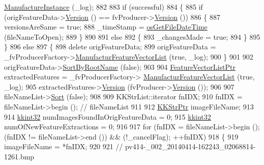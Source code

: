 \begin{DoxyCode}
      \hyperlink{class_k_k_m_l_l_1_1_factory_f_v_producer_ab69f27aed9bda4917326580ec824e749}{ManufactureInstance} (\_log);
882 
883   \textcolor{keywordflow}{if}  (successful)
884   \{
885     \textcolor{keywordflow}{if}  (origFeatureData->\hyperlink{class_k_k_m_l_l_1_1_feature_vector_list_a01b3c7a97f5b58639c8aee826fa15dc9}{Version} () == fvProducer->\hyperlink{class_k_k_m_l_l_1_1_feature_vector_producer_a8e2f54e185b2fb5de854d9978b4fbac8}{Version} ())
886     \{
887       versionsAreSame = \textcolor{keyword}{true};
888       \_timeStamp = \hyperlink{namespace_k_k_b_a0c28dcf4ba36d924a50454c84aee3931}{osGetFileDateTime} (fileNameToOpen);
889     \}
890 
891     \textcolor{keywordflow}{else}
892     \{
893       \_changesMade = \textcolor{keyword}{true};
894     \}
895   \}
896   \textcolor{keywordflow}{else}
897   \{
898     \textcolor{keyword}{delete}  origFeatureData;
899     origFeatureData = \_fvProducerFactory->\hyperlink{class_k_k_m_l_l_1_1_factory_f_v_producer_a96126b7adb55f6751450ede393c93086}{ManufacturFeatureVectorList} (\textcolor{keyword}{true}, 
      \_log);
900   \}
901 
902   origFeatureData->\hyperlink{class_k_k_m_l_l_1_1_feature_vector_list_a87e679a6419e6d7a1dc28a28d4cb96cb}{SortByRootName} (\textcolor{keyword}{false});
903 
904   \hyperlink{class_k_k_m_l_l_1_1_feature_vector_list}{FeatureVectorListPtr}  extractedFeatures = \_fvProducerFactory->
      \hyperlink{class_k_k_m_l_l_1_1_factory_f_v_producer_a96126b7adb55f6751450ede393c93086}{ManufacturFeatureVectorList} (\textcolor{keyword}{true}, \_log);
905   extractedFeatures->\hyperlink{class_k_k_m_l_l_1_1_feature_vector_list_a01b3c7a97f5b58639c8aee826fa15dc9}{Version} (fvProducer->\hyperlink{class_k_k_m_l_l_1_1_feature_vector_producer_a8e2f54e185b2fb5de854d9978b4fbac8}{Version} ());
906 
907   fileNameList->\hyperlink{class_k_k_b_1_1_k_k_str_list_a239828772f41e47f3a136ea15e40f5d6}{Sort} (\textcolor{keyword}{false});
908 
909   KKStrList::iterator  fnIDX;
910   fnIDX = fileNameList->begin ();   \textcolor{comment}{// fileNameList}
911 
912   \hyperlink{class_k_k_b_1_1_k_k_str}{KKStrPtr}  imageFileName;
913 
914   \hyperlink{namespace_k_k_b_a8fa4952cc84fda1de4bec1fbdd8d5b1b}{kkint32}  numImagesFoundInOrigFeatureData = 0;
915   \hyperlink{namespace_k_k_b_a8fa4952cc84fda1de4bec1fbdd8d5b1b}{kkint32}  numOfNewFeatureExtractions = 0;
916 
917   \textcolor{keywordflow}{for}  (fnIDX = fileNameList->begin ();  (fnIDX != fileNameList->end ())  &&  (!\_cancelFlag);  ++fnIDX)
918   \{
919     imageFileName = *fnIDX;
920 
921     \textcolor{comment}{// pv414-\_002\_20140414-162243\_02068814-1261.bmp}

\end{DoxyCode}
